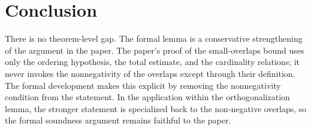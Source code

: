 \documentclass[11pt]{article}
\begin{document}
\section{Conclusion}

There is no theorem-level gap. The formal lemma is a conservative strengthening
of the argument in the paper. The paper's proof of the
small-overlaps bound uses only the ordering hypothesis, the total estimate, and
the cardinality relations; it never invokes the nonnegativity of the overlaps
except through their definition. The formal development makes this explicit by
removing the nonnegativity condition from the statement. In the application
within the orthogonalization lemma, the stronger statement is specialized back to
the non-negative overlaps, so the formal soundness argument remains faithful to
the paper.



\end{document}
